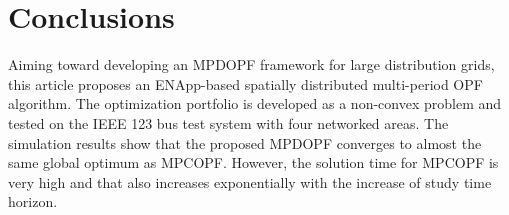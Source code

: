 \documentclass{article}
\begin{document}
\section{Conclusions}
Aiming toward developing an MPDOPF framework for large distribution grids, this article proposes an ENApp-based spatially distributed multi-period OPF algorithm. The optimization portfolio is developed as a non-convex problem and tested on the IEEE 123 bus test system with four networked areas. The simulation results show that the proposed MPDOPF converges to almost the same global optimum as MPCOPF. However, the solution time for MPCOPF is very high and that also increases exponentially with the increase of study time horizon. 
\end{document}
